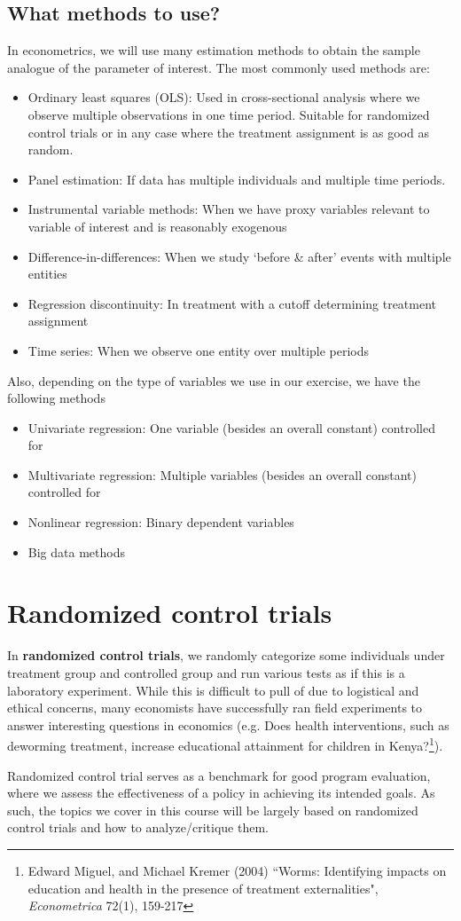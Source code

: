 \documentclass[12pt]{article}
\theoremstyle{definition}
\theoremstyle{property}
\theoremstyle{assumption}
\theoremstyle{example}
\theoremstyle{comment}
\begin{document}
\subsection{What methods to use?}
In econometrics, we will use many estimation methods to obtain the sample analogue of the parameter of interest. The most commonly used methods are:
\begin{itemize}
\item Ordinary least squares (OLS): Used in cross-sectional analysis where we observe multiple observations in one time period. Suitable for randomized control trials or in any case where the treatment assignment is as good as random.
\item Panel estimation: If data has multiple individuals and multiple time periods.
\item Instrumental variable methods: When we have proxy variables relevant to variable of interest and is reasonably exogenous
\item Difference-in-differences: When we study `before \& after' events with multiple entities
\item Regression discontinuity: In treatment with a cutoff determining treatment assignment
\item Time series: When we observe one entity over multiple periods 
\end{itemize}
Also, depending on the type of variables we use in our exercise, we have the following methods
\begin{itemize}
\item Univariate regression: One variable (besides an overall constant) controlled for
\item Multivariate regression: Multiple variables (besides an overall constant) controlled for
\item Nonlinear regression: Binary dependent variables
\item Big data methods
\end{itemize}

\section{Randomized control trials}
In \textbf{randomized control trials}, we randomly categorize some individuals under treatment group and controlled group and run various tests as if this is a laboratory experiment. While this is difficult to pull of due to logistical and ethical concerns, many economists have successfully ran field experiments to answer interesting questions in economics (e.g. Does health interventions, such as deworming treatment, increase educational attainment for children in Kenya?\footnote{Edward Miguel, and Michael Kremer (2004) ``Worms: Identifying impacts on education and health in the presence of treatment externalities", \textit{Econometrica} 72(1), 159-217 }). \par
Randomized control trial serves as a benchmark for good program evaluation, where we assess the effectiveness of a policy in achieving its intended goals. As such, the topics we cover in this course will be largely based on randomized control trials and how to analyze/critique them. 
\par
\end{document}
